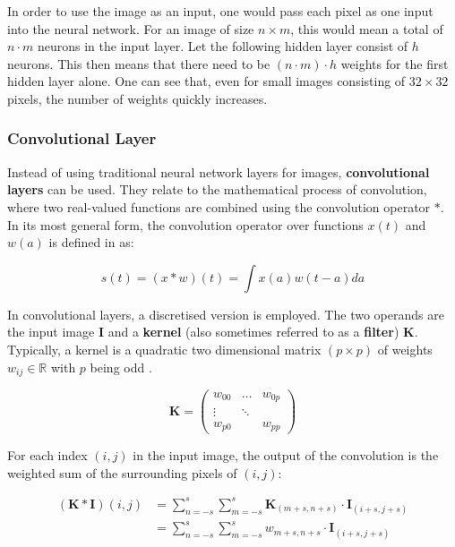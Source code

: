 In order to use the image as an input, one would pass each pixel as one input into the neural network.
For an image of size $n \times m$, this would mean a total of $n \cdot m$ neurons in the input layer.
Let the following hidden layer consist of $h$ neurons.
This then means that there need to be $(n \cdot m) \cdot h$ weights for the first hidden layer alone.
One can see that, even for small images consisting of $32 \times 32$ pixels, the number of weights quickly increases.

\subsubsection{Convolutional Layer}

Instead of using traditional neural network layers for images, \textbf{convolutional layers} can be used.
They relate to the mathematical process of convolution, where two real-valued functions are combined using the convolution operator $*$.
In its most general form, the convolution operator over functions $x(t)$ and $w(a)$ is defined in \cite{goodfellow_deep_2016} as:

\begin{equation}
    s(t) = (x * w)(t) = \int x(a)w(t-a)da
\end{equation}

In convolutional layers, a discretised version is employed.
The two operands are the input image $\bm{I}$ and a \textbf{kernel} (also sometimes referred to as a \textbf{filter}) $\bm{K}$.
Typically, a kernel is a quadratic two dimensional matrix $(p \times p)$ of weights $w_{ij} \in \mathbb{R}$ with $p$ being odd .

\begin{equation}
    \label{eq:kernel_definition}
    \bm{K} = 
    \begin{pmatrix}
        w_{00} & \dots  & w_{0p} \\
        \vdots & \ddots & \\
        w_{p0} &        & w_{pp}
    \end{pmatrix}
\end{equation}

For each index $(i,j)$ in the input image, the output of the convolution is the weighted sum of the surrounding pixels of $(i,j)$:

\begin{equation}
    \begin{split}
        (\bm{K} * \bm{I})(i,j) 
        &= \sum_{n=-s}^s \sum_{m=-s}^s \bm{K}_{(m+s, n+s)} \cdot \bm{I}_{(i+s, j+s)} \\
        &= \sum_{n=-s}^s \sum_{m=-s}^s w_{m+s, n+s} \cdot \bm{I}_{(i+s, j+s)}
    \end{split}
\end{equation}

